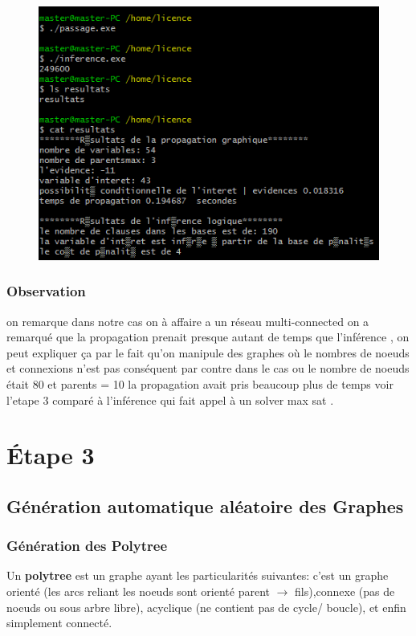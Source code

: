 \documentclass[12pt,a4paper,oneside]{book}
\begin{document}
      		\begin{figure}[H]
      				\centering
      			\includegraphics[scale=1.1]{screens/etape2.png}%
      			\label{labelname}%
      		\end{figure}
        
        
        \subsubsection{Observation}
        on remarque dans notre cas on à affaire a un réseau multi-connected on a remarqué que la propagation prenait presque autant de temps que l'inférence , on peut expliquer ça par le fait qu'on manipule des graphes où le nombres de noeuds et connexions n'est pas conséquent par contre dans le cas ou le nombre de noeuds était 80 et parents = 10 la propagation avait pris beaucoup plus de temps  voir l'etape 3 comparé à l'inférence qui fait appel à un solver max sat .

       
    \section{Étape 3}
    \subsection{Génération automatique aléatoire des Graphes}
    \subsubsection{Génération des Polytree}
    Un \textbf{polytree} est un graphe ayant les particularités suivantes: c'est un graphe orienté (les arcs reliant les noeuds sont orienté parent $\rightarrow$ fils),connexe (pas de noeuds ou sous arbre libre), acyclique (ne contient pas de cycle/ boucle), et enfin simplement connecté.\\
    
\end{document}
